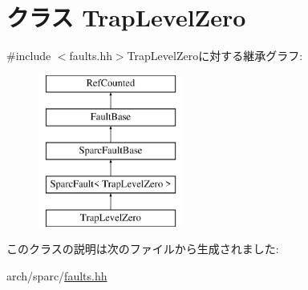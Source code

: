 \hypertarget{classSparcISA_1_1TrapLevelZero}{
\section{クラス TrapLevelZero}
\label{classSparcISA_1_1TrapLevelZero}
}


{\ttfamily \#include $<$faults.hh$>$}TrapLevelZeroに対する継承グラフ:\begin{figure}[H]
\begin{center}
\leavevmode
\includegraphics[height=5cm]{classSparcISA_1_1TrapLevelZero}
\end{center}
\end{figure}


このクラスの説明は次のファイルから生成されました:\begin{DoxyCompactItemize}
\item 
arch/sparc/\hyperlink{arch_2sparc_2faults_8hh}{faults.hh}\end{DoxyCompactItemize}
